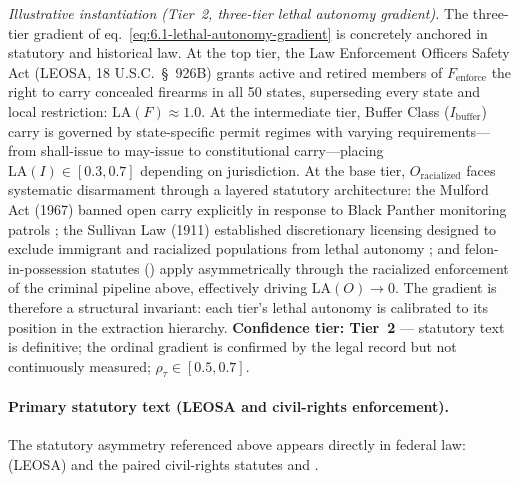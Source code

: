\noindent\textit{Illustrative instantiation (Tier~2, three-tier lethal autonomy gradient).} The three-tier gradient of eq.~\ref{eq:6.1-lethal-autonomy-gradient} is concretely anchored in statutory and historical law. At the top tier, the Law Enforcement Officers Safety Act (LEOSA, 18 U.S.C.~\S~926B) grants active and retired members of $F_{\text{enforce}}$ the right to carry concealed firearms in all 50 states, superseding every state and local restriction: $\text{LA}(F) \approx 1.0$. At the intermediate tier, Buffer Class ($I_{\text{buffer}}$) carry is governed by state-specific permit regimes with varying requirements---from shall-issue to may-issue to constitutional carry---placing $\text{LA}(I) \in [0.3, 0.7]$ depending on jurisdiction. At the base tier, $O_{\text{racialized}}$ faces systematic disarmament through a layered statutory architecture: the Mulford Act (1967) banned open carry explicitly in response to Black Panther monitoring patrols \cite{mulford1967}; the Sullivan Law (1911) established discretionary licensing designed to exclude immigrant and racialized populations from lethal autonomy \cite{sullivanlaw}; and felon-in-possession statutes () apply asymmetrically through the racialized enforcement of the criminal pipeline above, effectively driving $\text{LA}(O) \to 0$. The gradient is therefore a structural invariant: each tier's lethal autonomy is calibrated to its position in the extraction hierarchy. \textbf{Confidence tier: Tier~2} --- statutory text is definitive; the ordinal gradient is confirmed by the legal record but not continuously measured; $\rho_\tau \in [0.5, 0.7]$.

\paragraph{Primary statutory text (LEOSA and civil-rights enforcement).}
The statutory asymmetry referenced above appears directly in federal law:  (LEOSA) and the paired civil-rights statutes  and .

